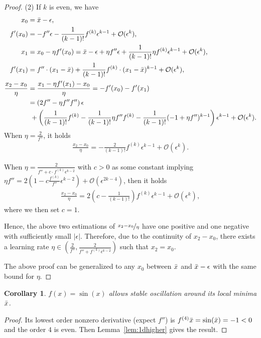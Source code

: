\documentclass{article}
\theoremstyle{plain}
\newtheorem{coro}{Corollary}
\theoremstyle{remark}
\newcommand{\T}[1]{^{(#1)}}
\def\O{\mathcal{O}}
\begin{document}
\begin{proof}
(2)
If $k$ is even, we have
\begin{align*}
    x_0 &= \Bar{x}-\epsilon, \\
    f'(x_0) &= -f''\epsilon - \frac{1}{(k-1)!}f\T{k}\epsilon^{k-1} + \O(\epsilon^{k}),\\
    x_1 &= x_0-\eta f'(x_0) = \Bar{x}-\epsilon +\eta f''\epsilon + \frac{1}{(k-1)!}\eta f\T{k}\epsilon^{k-1}  + \O(\epsilon^{k}),\\
    f'(x_1) &= f''\cdot(x_1-\Bar{x})+\frac{1}{(k-1)!}f\T{k}\cdot(x_1-\Bar{x})^{k-1}+\O(\epsilon^{k}), \\
    \frac{x_2-x_0}{\eta} &= \frac{x_1-\eta f'(x_1)-x_0}{\eta} =-f'(x_0)-f'(x_1) \\
    &= \left(2f''-\eta f'' f''\right)\epsilon \\
    &~ + \left(\frac{1}{(k-1)!}f\T{k}-\frac{1}{(k-1)!}\eta f''f\T{k}-\frac{1}{(k-1)!}(-1+\eta f'')^{k-1}\right)\epsilon^{k-1} + \O(\epsilon^k).
\end{align*}
When $\eta=\frac{2}{f''}$, it holds
\begin{align*}
    \frac{x_2-x_0}{\eta}=-\frac{2}{(k-1)!}f\T{k}\epsilon^{k-1}+\O(\epsilon^k).
\end{align*}

When $\eta=\frac{2}{f''+c\cdot f\T{k}\epsilon^{k-2}}$ with $c>0$ as some constant implying $\eta f''=2(1-c\frac{f\T{k}}{f''}\epsilon^{k-2})+\O(\epsilon^{2k-4})$, then it holds
\begin{align*}
    \frac{x_2-x_0}{\eta}=2\left(c-\frac{1}{(k-1)!}\right)f\T{k}\epsilon^{k-1} + \O(\epsilon^k),
\end{align*}
where we then set $c=1$.

Hence, the above two estimations of $\nicefrac{x_2-x_0}{\eta}$ have one positive and one negative with sufficiently small $|\epsilon|$.
Therefore, due to the continuity of $x_2-x_0$, there exists a learning rate $\eta\in(\frac{2}{f''}, \frac{2}{f''+f\T{k}\epsilon^{k-2}})$ such that $x_2=x_0$. 

The above proof can be generalized to any $x_0$ between $\Bar{x}$ and $\Bar{x}-\epsilon$ with the same bound for $\eta$.
\end{proof}

\begin{coro}
$f(x)=\sin(x)$ allows stable oscillation around its local minima $\Bar{x}$.
\label{cor:sin}
\end{coro}
\begin{proof}
Its lowest order nonzero derivative (expect $f''$) is $f\T{4}{\Bar{x}}=\sin(\Bar{x})=-1<0$ and the order $4$ is even. Then Lemma~\ref{lem:1dhigher} gives the result.
\end{proof}%
\end{document}
